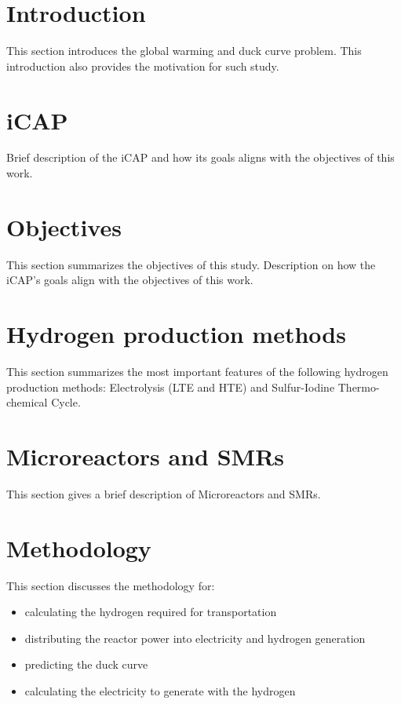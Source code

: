 \section{Introduction}

This section introduces the global warming and duck curve problem.
This introduction also provides the motivation for such study.

\section{iCAP}

Brief description of the iCAP and how its goals aligns with the objectives of this work.

\section{Objectives}

This section summarizes the objectives of this study.
Description on how the iCAP's goals align with the objectives of this work.

\section{Hydrogen production methods}

This section summarizes the most important features of the following hydrogen production methods: Electrolysis (LTE and HTE) and Sulfur-Iodine Thermo-chemical Cycle.

\section{Microreactors and \glspl{SMR}}

This section gives a brief description of Microreactors and SMRs.

\section{Methodology}

This section discusses the methodology for:
\begin{itemize}
\item calculating the hydrogen required for transportation
\item distributing the reactor power into electricity and hydrogen generation
\item predicting the duck curve
\item calculating the electricity to generate with the hydrogen
\end{itemize}



